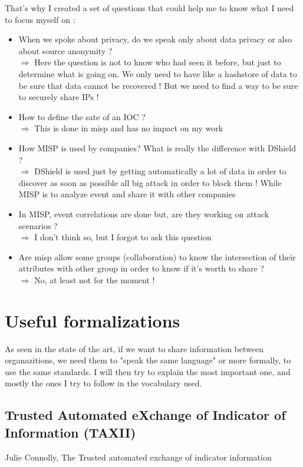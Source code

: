 \documentclass{eplmastersthesis}
\begin{document}
That's why I created a set of questions that could help me to know what I need to focus myself on :
\begin{itemize}
\item When we spoke about privacy, do we speak only about data privacy or also about source anonymity ? \\
$\Rightarrow$ Here the question is not to know who had seen it before, but just to determine what is going on. We only need to have like a hashstore of data to be sure that data cannot be recovered ! But we need to find a way to be sure to securely share IPs !
\item How to define the sate of an IOC ?\\
 $\Rightarrow$ This is done in misp and has no impact on my work
\item How MISP is used by companies? What is really the difference with DShield ?\\
$\Rightarrow$ DShield is used just by getting automatically a lot of data in order to discover as soon as possible all big attack in order to block them ! While MISP is to analyze event and share it with other companies
\item In MISP, event correlations are done but, are they working on attack scenarios ?\\
$\Rightarrow$ I don't think so, but I forgot to ask this question
\item Are misp allow some groups (collaboration) to know the intersection of their attributes with other group in order to know if it's worth to share ?\\
 $\Rightarrow$ No, at least not for the moment !
\end{itemize}

\section{Useful formalizations}
As seen in the state of the art, if we want to share information between organazitions, we need them to "speak the same language" or more formally, to use the same standards. I will then try to explain the most important one, and mostly the ones I try to follow in the vocabulary used.

\subsection{Trusted Automated eXchange of Indicator of Information (TAXII)}
Julie Connolly, The Trusted automated exchange of indicator information
\end{document}
